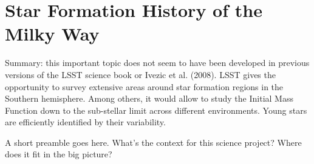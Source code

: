 %
%
%
%
%
%
%

\section{Star Formation History of the Milky Way}
\def\secname{MW_SFH}\label{sec:\secname} %



Summary: this important topic does not seem to have been developed in
previous versions of the LSST science book or Ivezic et
al. (2008). LSST gives the opportunity to survey extensive areas
around star formation regions in the Southern hemisphere. Among
others, it would allow to study the Initial Mass Function down to the
sub-stellar limit across different environments. Young stars are
efficiently identified by their variability.

A short preamble goes here. What's the context for this science
project? Where does it fit in the big picture?

